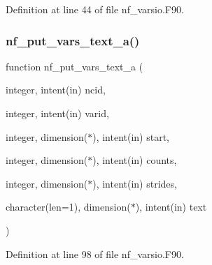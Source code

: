 Definition at line 44 of file nf\+\_\+varsio.\+F90.

\mbox{\label{nf__varsio_8F90_aad23992faf28c3dcc859498ea186594c}} 
\subsubsection{\texorpdfstring{nf\+\_\+put\+\_\+vars\+\_\+text\+\_\+a()}{nf\_put\_vars\_text\_a()}}
{\footnotesize\ttfamily function nf\+\_\+put\+\_\+vars\+\_\+text\+\_\+a (\begin{DoxyParamCaption}\item[{integer, intent(in)}]{ncid,  }\item[{integer, intent(in)}]{varid,  }\item[{integer, dimension($\ast$), intent(in)}]{start,  }\item[{integer, dimension($\ast$), intent(in)}]{counts,  }\item[{integer, dimension($\ast$), intent(in)}]{strides,  }\item[{character(len=1), dimension($\ast$), intent(in)}]{text }\end{DoxyParamCaption})}



Definition at line 98 of file nf\+\_\+varsio.\+F90.

